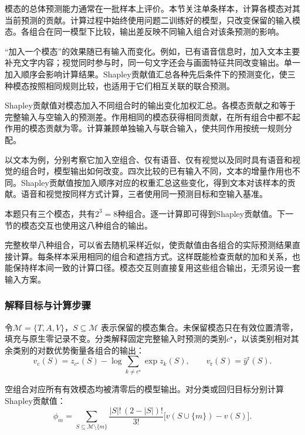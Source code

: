 模态的总体预测能力通常在一批样本上评价。本节关注单条样本，计算各模态对其当前预测的贡献。计算过程中始终使用问题二训练好的模型，只改变保留的输入模态。各组合在同一模型下比较，输出差反映不同输入组合对该条预测的影响。

“加入一个模态”的效果随已有输入而变化。例如，已有语音信息时，加入文本主要补充文字内容；视觉同时参与时，同一句文字还会与画面特征共同改变输出。单一加入顺序会影响计算结果。Shapley贡献值汇总各种先后条件下的预测变化，使三种模态按照相同规则比较，也适用于它们相互关联的联合预测。

Shapley贡献值对模态加入不同组合时的输出变化加权汇总。各模态贡献之和等于完整输入与空输入的预测差。作用相同的模态获得相同贡献，在所有组合中都不起作用的模态贡献为零。计算兼顾单独输入与联合输入，使共同作用按统一规则分配。

以文本为例，分别考察它加入空组合、仅有语音、仅有视觉以及同时具有语音和视觉的组合时，模型输出如何改变。四次比较的已有输入不同，文本的增量作用也不同。Shapley贡献值按加入顺序对应的权重汇总这些变化，得到文本对该样本的贡献。语音和视觉按同样方式计算，三者使用同一预测目标和空输入基准。

本题只有三个模态，共有$2^3=8$种组合。逐一计算即可得到Shapley贡献值。下一节的模态交互也使用这八种组合的输出。

完整枚举八种组合，可以省去随机采样近似，使贡献值由各组合的实际预测结果直接计算。每条样本采用相同的组合和遮挡方式。这样既能检查贡献的加和关系，也能保持样本间一致的计算口径。模态交互则直接复用这些组合输出，无须另设一套输入方案。

\subsubsection{解释目标与计算步骤}
令$\mathcal M=\{T,A,V\}$，$S\subseteq\mathcal M$ 表示保留的模态集合。未保留模态只在有效位置清零，填充与原生零记录不变。分类解释固定完整输入时预测的类别$c^\star$，以该类别相对其余类别的对数优势衡量各组合的输出：
\begin{equation}
v_{\mathrm c}(S)
=z_{c^\star}(S)-\log\!\sum_{k\ne c^\star}\exp z_k(S),
\qquad
v_{\mathrm r}(S)=\widehat y^{\mathrm r}(S).
\label{eq:q3_value}
\end{equation}

空组合对应所有有效模态均被清零后的模型输出。对分类或回归目标分别计算Shapley贡献值：
\begin{equation}
\phi_m
=\sum_{S\subseteq\mathcal M\setminus\{m\}}
\frac{|S|!\,(2-|S|)!}{3!}
\bigl[v(S\cup\{m\})-v(S)\bigr].
\label{eq:q3_shapley}
\end{equation}

